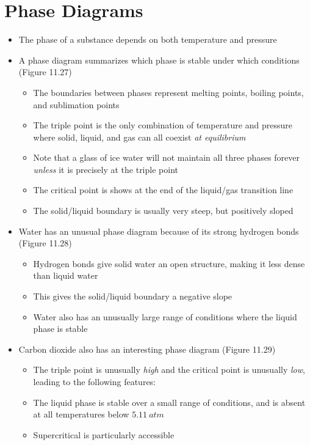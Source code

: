 \documentclass[12pt, openany, letterpaper]{memoir}
\begin{document}
\section{Phase Diagrams}
\begin{itemize}
	\item The phase of a substance depends on both temperature and pressure
	\item A phase diagram summarizes which phase is stable under which conditions (Figure 11.27)
	\begin{itemize}
		\item The boundaries between phases represent melting points, boiling points, and sublimation points
		\item The triple point is the only combination of temperature and pressure where solid, liquid, and gas can all coexist \emph{at equilibrium}
		\item Note that a glass of ice water will not maintain all three phases forever \emph{unless} it is precisely at the triple point
		\item The critical point is shows at the end of the liquid/gas transition line
		\item The solid/liquid boundary is usually very steep, but positively sloped
	\end{itemize}
	\item Water has an unusual phase diagram because of its strong hydrogen bonds (Figure 11.28)
	\begin{itemize}
		\item Hydrogen bonds give solid water an open structure, making it less dense than liquid water
		\item This gives the solid/liquid boundary a negative slope
		\item Water also has an unusually large range of conditions where the liquid phase is stable
	\end{itemize}
  \item Carbon dioxide also has an interesting phase diagram (Figure 11.29)
  \begin{itemize}
    \item The triple point is unusually \emph{high} and the critical point is unusually \emph{low}, leading to the following features:
    \item The liquid phase is stable over a small range of conditions, and is absent at all temperatures below $5.11~atm$
    \item Supercritical  is particularly accessible
  \end{itemize}
\end{itemize}
\end{document}
